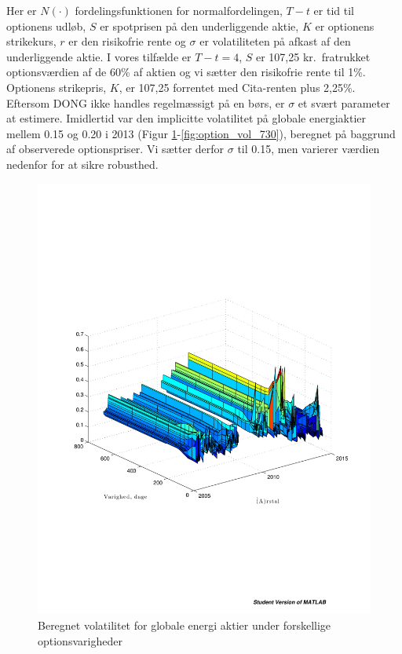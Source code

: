 \documentclass{article}
\begin{document}
Her er $N(\cdot)$ fordelingsfunktionen for normalfordelingen, $T-t$ er tid til optionens udløb, $S$ er spotprisen på den underliggende aktie, $K$ er optionens strikekurs, $r$ er den risikofrie rente og $\sigma$ er volatiliteten på afkast af den underliggende aktie. I vores tilfælde er $T-t=4$, $S$ er 107,25 kr.\ fratrukket optionsværdien af de 60\% af aktien og vi sætter den risikofrie rente til 1\%. Optionens strikepris, $K$, er 107,25 forrentet med Cita-renten plus 2,25\%. Eftersom DONG ikke handles regelmæssigt på en børs, er $\sigma$ et svært parameter at estimere. Imidlertid var den implicitte volatilitet på globale energiaktier mellem 0.15 og 0.20 i 2013 (Figur \ref{fig:option_vol_curve}-\ref{fig:option_vol_730}), beregnet på baggrund af observerede optionspriser. Vi sætter derfor $\sigma$ til 0.15, men varierer værdien nedenfor for at sikre robusthed. 

\begin{figure}
\includegraphics[scale=0.8]{../matlab/figs/implied_vol_curve}
\caption{Beregnet volatilitet for globale energi aktier under forskellige optionsvarigheder}
\label{fig:option_vol_curve}
\end{figure}
\end{document}
